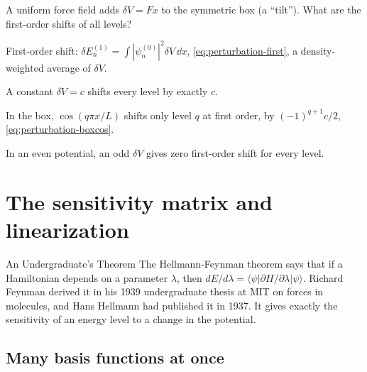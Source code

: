 \begin{checkpoint}
A uniform force field adds $\delta V=Fx$ to the symmetric box (a ``tilt''). What are the first-order shifts of all levels?
\end{checkpoint}

\begin{keyideas}
\item First-order shift: $\delta E_n^{(1)}=\int|\psi_n^{(0)}|^2\delta V\,\dd x$, \cref{eq:perturbation-first}, a density-weighted average of $\delta V$.
\item A constant $\delta V=c$ shifts every level by exactly $c$.
\item In the box, $\cos(q\pi x/L)$ shifts only level $q$ at first order, by $(-1)^{q+1}c/2$, \cref{eq:perturbation-boxcos}.
\item In an even potential, an odd $\delta V$ gives zero first-order shift for every level.
\end{keyideas}

\section{The sensitivity matrix and linearization}\label{sec:perturbation-sensitivity}
\begin{didyouknow}{An Undergraduate's Theorem}
The Hellmann-Feynman theorem says that if a Hamiltonian depends on a parameter $\lambda$, then $dE/d\lambda=\langle\psi|\partial H/\partial\lambda|\psi\rangle$. Richard Feynman derived it in his 1939 undergraduate thesis at MIT on forces in molecules, and Hans Hellmann had published it in 1937. It gives exactly the sensitivity of an energy level to a change in the potential.
\end{didyouknow}

\subsection{Many basis functions at once}

